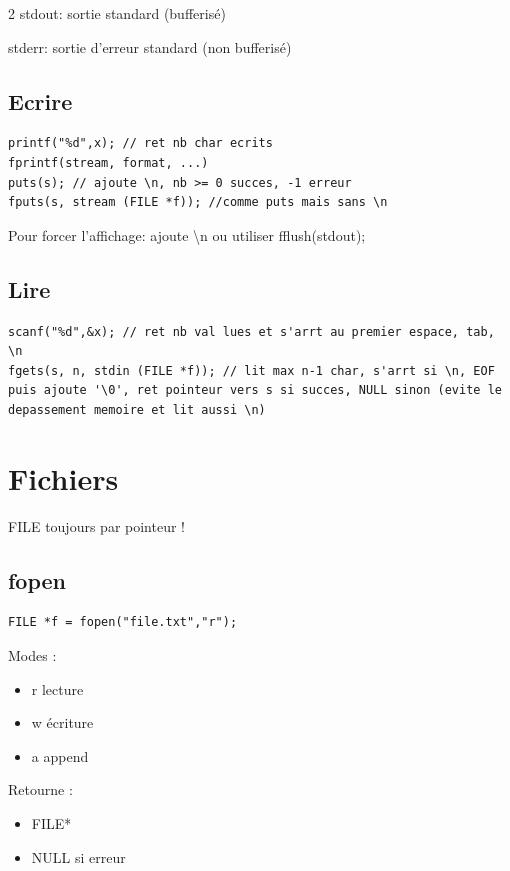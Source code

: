 \documentclass[8pt]{article}
\begin{document}
\begin{multicols}{2}
stdout: sortie standard (bufferisé)

stderr: sortie d'erreur standard (non bufferisé)

\subsection{Ecrire}

\begin{lstlisting}
printf("%d",x); // ret nb char ecrits
fprintf(stream, format, ...) 
puts(s); // ajoute \n, nb >= 0 succes, -1 erreur
fputs(s, stream (FILE *f)); //comme puts mais sans \n
\end{lstlisting}

Pour forcer l'affichage: ajoute \textbackslash n ou utiliser fflush(stdout);
\subsection{Lire}

\begin{lstlisting}
scanf("%d",&x); // ret nb val lues et s'arrt au premier espace, tab, \n
fgets(s, n, stdin (FILE *f)); // lit max n-1 char, s'arrt si \n, EOF puis ajoute '\0', ret pointeur vers s si succes, NULL sinon (evite le depassement memoire et lit aussi \n)
\end{lstlisting}

\section{Fichiers}

FILE toujours par pointeur !
\subsection{fopen}
\begin{lstlisting}
FILE *f = fopen("file.txt","r");
\end{lstlisting}

Modes :

\begin{itemize}
\item r lecture
\item w écriture
\item a append
\end{itemize}

Retourne :
\begin{itemize}
\item FILE*
\item NULL si erreur
\end{itemize}


\end{multicols}
\end{document}
